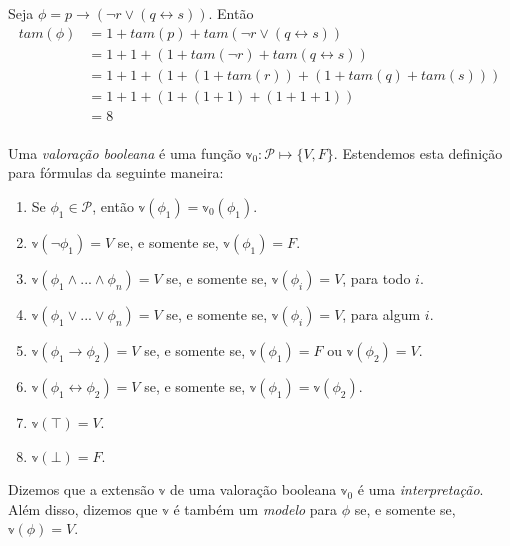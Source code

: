 \begin{example}
	Seja $\phi = p \rightarrow (\neg r \vee (q \leftrightarrow s))$. Então
	\begin{equation*}
	\begin{split}
	tam(\phi) & = 1 + tam(p) + tam(\neg r \vee (q \leftrightarrow s))\\
	& = 1 + 1 + (1 + tam(\neg r) + tam(q \leftrightarrow s))\\
	& = 1 + 1 + (1 + (1 + tam(r)) + (1 + tam(q) + tam(s)))\\
	& = 1 + 1 + (1 + (1 + 1) + (1 + 1 + 1))\\
	& = 8\\
	\end{split}
	\end{equation*}
\end{example}

\begin{definition}
    Uma \emph{valoração booleana} é uma função $\mathbb{v}_0 : \mathcal{P} \longmapsto \{V,F\}$. Estendemos esta definição para fórmulas da seguinte maneira:
    \begin{enumerate}
        \item Se $\phi_1 \in \mathcal{P}$, então $\mathbb{v}(\phi_1) = \mathbb{v}_0(\phi_1)$.
        \item $\mathbb{v}(\neg \phi_1) = V$ se, e somente se, $\mathbb{v}(\phi_1) = F$.
        \item $\mathbb{v}(\phi_1 \wedge ... \wedge \phi_n) = V$ se, e somente se, $\mathbb{v}(\phi_i) = V$, para todo $i$.
        \item $\mathbb{v}(\phi_1 \vee ... \vee \phi_n) = V$ se, e somente se, $\mathbb{v}(\phi_i) = V$, para algum $i$.
        \item $\mathbb{v}(\phi_1 \rightarrow \phi_2) = V$ se, e somente se, $\mathbb{v}(\phi_1) = F$ ou $\mathbb{v}(\phi_2) = V$.
        \item $\mathbb{v}(\phi_1 \leftrightarrow \phi_2) = V$ se, e somente se, $\mathbb{v}(\phi_1) = \mathbb{v}(\phi_2)$.
        \item $\mathbb{v}(\top) = V$.
        \item $\mathbb{v}(\bot) = F$.
    \end{enumerate}
    
    Dizemos que a extensão $\mathbb{v}$ de uma valoração booleana $\mathbb{v}_0$ é uma \emph{interpretação}. Além disso, dizemos que $\mathbb{v}$ é também um \emph{modelo} para $\phi$ se, e somente se, $\mathbb{v}(\phi) = V$.
\end{definition}

